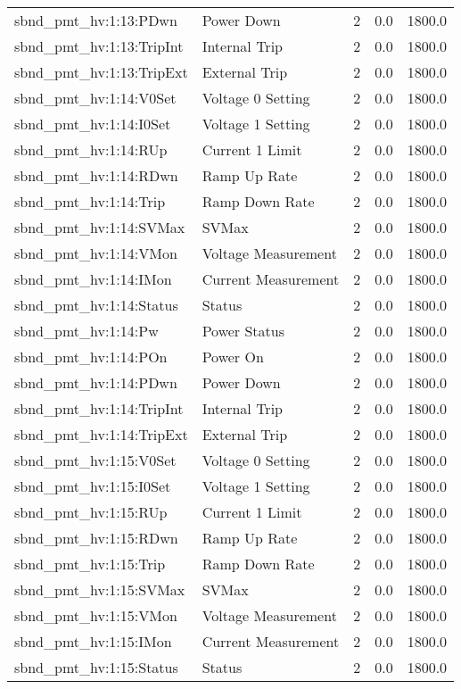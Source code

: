 \begin{center}
\begin{longtable}{l | l l l l }
sbnd\_pmt\_hv:1:13:PDwn & Power Down & 2 & 0.0 & 1800.0\\ 
sbnd\_pmt\_hv:1:13:TripInt & Internal Trip & 2 & 0.0 & 1800.0\\ 
sbnd\_pmt\_hv:1:13:TripExt & External Trip & 2 & 0.0 & 1800.0\\ 
sbnd\_pmt\_hv:1:14:V0Set & Voltage 0 Setting & 2 & 0.0 & 1800.0\\ 
sbnd\_pmt\_hv:1:14:I0Set & Voltage 1 Setting & 2 & 0.0 & 1800.0\\ 
sbnd\_pmt\_hv:1:14:RUp & Current 1 Limit & 2 & 0.0 & 1800.0\\ 
sbnd\_pmt\_hv:1:14:RDwn & Ramp Up Rate & 2 & 0.0 & 1800.0\\ 
sbnd\_pmt\_hv:1:14:Trip & Ramp Down Rate & 2 & 0.0 & 1800.0\\ 
sbnd\_pmt\_hv:1:14:SVMax & SVMax & 2 & 0.0 & 1800.0\\ 
sbnd\_pmt\_hv:1:14:VMon & Voltage Measurement & 2 & 0.0 & 1800.0\\ 
sbnd\_pmt\_hv:1:14:IMon & Current Measurement & 2 & 0.0 & 1800.0\\ 
sbnd\_pmt\_hv:1:14:Status & Status & 2 & 0.0 & 1800.0\\ 
sbnd\_pmt\_hv:1:14:Pw & Power Status & 2 & 0.0 & 1800.0\\ 
sbnd\_pmt\_hv:1:14:POn & Power On & 2 & 0.0 & 1800.0\\ 
sbnd\_pmt\_hv:1:14:PDwn & Power Down & 2 & 0.0 & 1800.0\\ 
sbnd\_pmt\_hv:1:14:TripInt & Internal Trip & 2 & 0.0 & 1800.0\\ 
sbnd\_pmt\_hv:1:14:TripExt & External Trip & 2 & 0.0 & 1800.0\\ 
sbnd\_pmt\_hv:1:15:V0Set & Voltage 0 Setting & 2 & 0.0 & 1800.0\\ 
sbnd\_pmt\_hv:1:15:I0Set & Voltage 1 Setting & 2 & 0.0 & 1800.0\\ 
sbnd\_pmt\_hv:1:15:RUp & Current 1 Limit & 2 & 0.0 & 1800.0\\ 
sbnd\_pmt\_hv:1:15:RDwn & Ramp Up Rate & 2 & 0.0 & 1800.0\\ 
sbnd\_pmt\_hv:1:15:Trip & Ramp Down Rate & 2 & 0.0 & 1800.0\\ 
sbnd\_pmt\_hv:1:15:SVMax & SVMax & 2 & 0.0 & 1800.0\\ 
sbnd\_pmt\_hv:1:15:VMon & Voltage Measurement & 2 & 0.0 & 1800.0\\ 
sbnd\_pmt\_hv:1:15:IMon & Current Measurement & 2 & 0.0 & 1800.0\\ 
sbnd\_pmt\_hv:1:15:Status & Status & 2 & 0.0 & 1800.0\\ 

\end{longtable}
\end{center}
